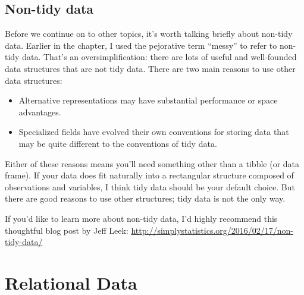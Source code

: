 \documentclass[]{book}
\newenvironment{Shaded}{\begin{snugshade}}{\end{snugshade}}
\newcommand{\KeywordTok}[1]{\textcolor[rgb]{0.13,0.29,0.53}{\textbf{#1}}}
\newcommand{\StringTok}[1]{\textcolor[rgb]{0.31,0.60,0.02}{#1}}
\newcommand{\CommentTok}[1]{\textcolor[rgb]{0.56,0.35,0.01}{\textit{#1}}}
\newcommand{\OperatorTok}[1]{\textcolor[rgb]{0.81,0.36,0.00}{\textbf{#1}}}
\newcommand{\NormalTok}[1]{#1}
\theoremstyle{definition}
\theoremstyle{definition}
\theoremstyle{definition}
\theoremstyle{remark}
\begin{document}
\begin{Shaded}
\end{Shaded}

\section{Non-tidy data}\label{non-tidy-data}

Before we continue on to other topics, it's worth talking briefly about
non-tidy data. Earlier in the chapter, I used the pejorative term
``messy'' to refer to non-tidy data. That's an oversimplification: there
are lots of useful and well-founded data structures that are not tidy
data. There are two main reasons to use other data structures:

\begin{itemize}
\item
  Alternative representations may have substantial performance or space
  advantages.
\item
  Specialized fields have evolved their own conventions for storing data
  that may be quite different to the conventions of tidy data.
\end{itemize}

Either of these reasons means you'll need something other than a tibble
(or data frame). If your data does fit naturally into a rectangular
structure composed of observations and variables, I think tidy data
should be your default choice. But there are good reasons to use other
structures; tidy data is not the only way.

If you'd like to learn more about non-tidy data, I'd highly recommend
this thoughtful blog post by Jeff Leek:
\url{http://simplystatistics.org/2016/02/17/non-tidy-data/}

\hypertarget{relational-data}{\chapter{Relational
Data}\label{relational-data}}
\end{document}
